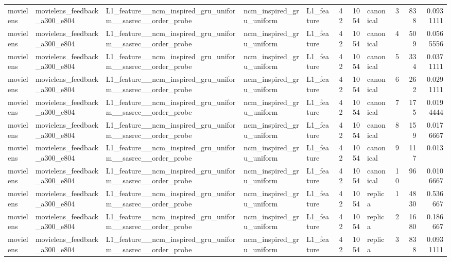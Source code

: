 \begin{table}[htbp!]
\begin{tabular}{lllllrrlrrr}
movielens & movielens\_feedback\_a300\_e804 & L1\_feature\_\_ncm\_inspired\_gru\_uniform\_\_sasrec\_\_order\_probe & ncm\_inspired\_gru\_uniform & L1\_feature & 42 & 1054 & canonical & 3 & 838 & 0.0931111 \\
movielens & movielens\_feedback\_a300\_e804 & L1\_feature\_\_ncm\_inspired\_gru\_uniform\_\_sasrec\_\_order\_probe & ncm\_inspired\_gru\_uniform & L1\_feature & 42 & 1054 & canonical & 4 & 509 & 0.0565556 \\
movielens & movielens\_feedback\_a300\_e804 & L1\_feature\_\_ncm\_inspired\_gru\_uniform\_\_sasrec\_\_order\_probe & ncm\_inspired\_gru\_uniform & L1\_feature & 42 & 1054 & canonical & 5 & 334 & 0.0371111 \\
movielens & movielens\_feedback\_a300\_e804 & L1\_feature\_\_ncm\_inspired\_gru\_uniform\_\_sasrec\_\_order\_probe & ncm\_inspired\_gru\_uniform & L1\_feature & 42 & 1054 & canonical & 6 & 262 & 0.0291111 \\
movielens & movielens\_feedback\_a300\_e804 & L1\_feature\_\_ncm\_inspired\_gru\_uniform\_\_sasrec\_\_order\_probe & ncm\_inspired\_gru\_uniform & L1\_feature & 42 & 1054 & canonical & 7 & 175 & 0.0194444 \\
movielens & movielens\_feedback\_a300\_e804 & L1\_feature\_\_ncm\_inspired\_gru\_uniform\_\_sasrec\_\_order\_probe & ncm\_inspired\_gru\_uniform & L1\_feature & 42 & 1054 & canonical & 8 & 159 & 0.0176667 \\
movielens & movielens\_feedback\_a300\_e804 & L1\_feature\_\_ncm\_inspired\_gru\_uniform\_\_sasrec\_\_order\_probe & ncm\_inspired\_gru\_uniform & L1\_feature & 42 & 1054 & canonical & 9 & 117 & 0.013 \\
movielens & movielens\_feedback\_a300\_e804 & L1\_feature\_\_ncm\_inspired\_gru\_uniform\_\_sasrec\_\_order\_probe & ncm\_inspired\_gru\_uniform & L1\_feature & 42 & 1054 & canonical & 10 & 96 & 0.0106667 \\
movielens & movielens\_feedback\_a300\_e804 & L1\_feature\_\_ncm\_inspired\_gru\_uniform\_\_sasrec\_\_order\_probe & ncm\_inspired\_gru\_uniform & L1\_feature & 42 & 1054 & replica & 1 & 4830 & 0.536667 \\
movielens & movielens\_feedback\_a300\_e804 & L1\_feature\_\_ncm\_inspired\_gru\_uniform\_\_sasrec\_\_order\_probe & ncm\_inspired\_gru\_uniform & L1\_feature & 42 & 1054 & replica & 2 & 1680 & 0.186667 \\
movielens & movielens\_feedback\_a300\_e804 & L1\_feature\_\_ncm\_inspired\_gru\_uniform\_\_sasrec\_\_order\_probe & ncm\_inspired\_gru\_uniform & L1\_feature & 42 & 1054 & replica & 3 & 838 & 0.0931111 \\

\end{tabular}
\end{table}
